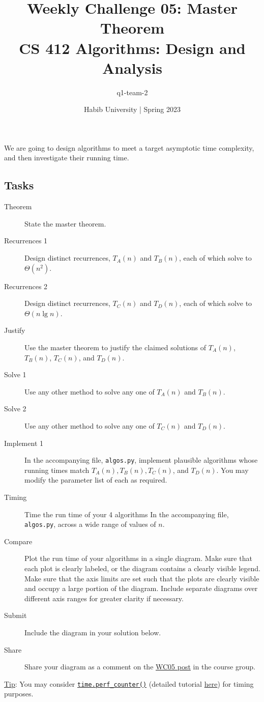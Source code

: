 \documentclass[a4paper]{exam}
\title{Weekly Challenge 05: Master Theorem\\CS 412 Algorithms: Design and Analysis}
\author{q1-team-2}  %
\date{Habib University | Spring 2023}
\theoremstyle{mytheoremstyle}
\theoremstyle{mytheoremstyle}
\theoremstyle{myproblemstyle}
\begin{document}
\maketitle

\begin{questions}



	We are going to design algorithms to meet a target asymptotic time complexity, and then investigate their running time.

	\subsection*{Tasks}
	\begin{description}
		\item[Theorem] State the master theorem.
		\item[Recurrences 1] Design distinct recurrences, $T_A(n)$ and $T_B(n)$, each of which solve to $\Theta(n^2)$.
		\item[Recurrences 2] Design distinct recurrences, $T_C(n)$ and $T_D(n)$, each of which solve to $\Theta(n\lg n)$.
		\item[Justify] Use the master theorem to justify the claimed solutions of  $T_A(n)$, $T_B(n)$, $T_C(n)$, and $T_D(n)$.
		\item[Solve 1] Use any other method to solve any one of  $T_A(n)$ and $T_B(n)$.
		\item[Solve 2] Use any other method to solve any one of  $T_C(n)$ and $T_D(n)$.
		\item[Implement 1] In the accompanying file, \texttt{algos.py}, implement plausible algorithms whose running times match $T_A(n),T_B(n), T_C(n)$, and $T_D(n)$. You may modify the parameter list of each as required.
		\item[Timing] Time the run time of your 4 algorithms In the accompanying file, \texttt{algos.py}, across a wide range of values of $n$.
		\item[Compare] Plot the run time of your algorithms in a single diagram. Make sure that each plot is clearly labeled, or the diagram contains a clearly visible legend. Make sure that the axis limits are set such that the plots are clearly visible and occupy a large portion of the diagram. Include separate diagrams over different axis ranges for greater clarity if necessary.
		\item[Submit] Include the diagram in your solution below.
		\item[Share] Share your diagram as a comment on the \href{https://web.yammer.com/main/org/habib.edu.pk/threads/eyJfdHlwZSI6IlRocmVhZCIsImlkIjoiMjEyMzI4NzkzMzY4MTY2NCJ9}{WC05 post} in the course group.
	\end{description}
	\underline{Tip}: You may consider \href{https://stackoverflow.com/a/68054319/1382487}{\texttt{time.perf\_counter()}} (detailed tutorial \href{https://realpython.com/python-timer/#other-python-timer-functions}{here}) for timing purposes.


\end{questions}
\end{document}
